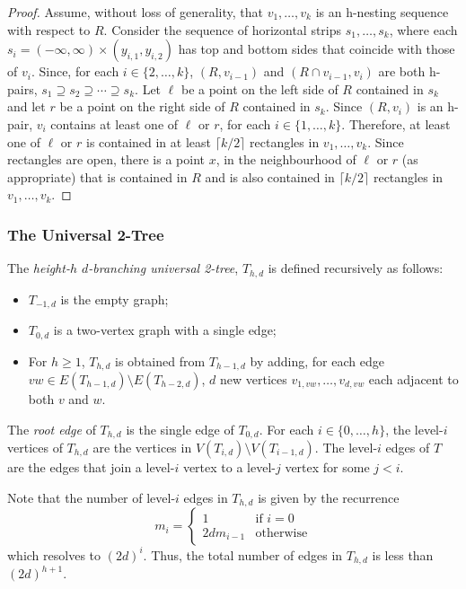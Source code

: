 \documentclass[lotsofwhite]{patmorin}
\begin{document}
\begin{proof}
   Assume, without loss of generality, that $v_1,\ldots,v_k$
   is an h-nesting sequence with respect to $R$.  Consider the
   sequence of horizontal strips $s_1,\ldots,s_k$, where each
   $s_i=(-\infty,\infty)\times (y_{i,1},y_{i,2})$ has top and
   bottom sides that coincide with those of $v_i$. Since, for each
   $i\in\{2,\ldots,k\}$, $(R,v_{i-1})$ and $(R\cap v_{i-1},v_i)$
   are both h-pairs, $s_1\supseteq s_2\supseteq\cdots\supseteq s_k$.
   Let $\ell$ be a point on the left side of $R$ contained in $s_k$
   and let $r$ be a point on the right side of $R$ contained in $s_k$.
   Since $(R,v_i)$ is an h-pair, $v_i$ contains at least one of $\ell$
   or $r$, for each $i\in\{1,\ldots,k\}$.  Therefore, at least one of
   $\ell$ or $r$ is contained in at least $\lceil k/2\rceil$ rectangles
   in $v_1,\ldots,v_k$.  Since rectangles are open, there is a point
   $x$, in the neighbourhood of $\ell$ or $r$ (as appropriate) that
   is contained in $R$ and is also contained in $\lceil k/2\rceil$
   rectangles in $v_1,\ldots,v_k$.
\end{proof}

\subsubsection{The Universal 2-Tree}

The \emph{height-$h$ $d$-branching universal 2-tree}, $T_{h,d}$ is
defined recursively as follows:
\begin{itemize}
  \item $T_{-1,d}$ is the empty graph;
  \item $T_{0,d}$ is a two-vertex graph with a single edge;
  \item For $h\ge 1$, $T_{h,d}$ is obtained from $T_{h-1,d}$ by adding,
     for each edge $vw \in E(T_{h-1,d})\setminus E(T_{h-2,d})$, $d$
     new vertices $v_{1,vw},\ldots,v_{d,vw}$ each adjacent to both $v$
     and $w$.
\end{itemize}
The \emph{root edge} of $T_{h,d}$ is the single edge of $T_{0,d}$.
For each $i\in\{0,\ldots,h\}$, the level-$i$ vertices of $T_{h,d}$
are the vertices in $V(T_{i,d})\setminus V(T_{i-1,d})$.  The level-$i$
edges of $T$ are the edges that join a level-$i$ vertex to a level-$j$
vertex for some $j<i$.

Note that the number of level-$i$ edges in $T_{h,d}$ is given by the recurrence
\[
   m_i = \begin{cases}
           1 & \text{if $i=0$} \\
           2dm_{i-1} & \text{otherwise}
       \end{cases}
\]
which resolves to $(2d)^{i}$.  Thus, the total number of edges in
$T_{h,d}$ is less than $(2d)^{h+1}$.
\end{document}
